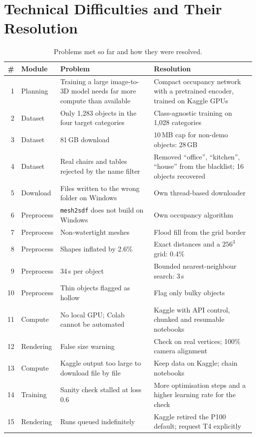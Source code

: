 \chapter{Technical Difficulties and Their Resolution}

\begin{table}[H]
\centering
\caption{Problems met so far and how they were resolved.}
\small
\begin{tabularx}{\textwidth}{rlXX}
\toprule
\# & Module & Problem & Resolution \\
\midrule
1 & Planning & Training a large image-to-3D model needs far more compute than available & Compact occupancy network with a pretrained encoder, trained on Kaggle GPUs \\
2 & Dataset & Only 1{,}283 objects in the four target categories & Class-agnostic training on 1{,}028 categories \\
3 & Dataset & 81\,GB download & 10\,MB cap for non-demo objects: 28\,GB \\
4 & Dataset & Real chairs and tables rejected by the name filter & Removed ``office'', ``kitchen'', ``house'' from the blacklist; 16 objects recovered \\
5 & Download & Files written to the wrong folder on Windows & Own thread-based downloader \\
6 & Preprocess & \texttt{mesh2sdf} does not build on Windows & Own occupancy algorithm \\
7 & Preprocess & Non-watertight meshes & Flood fill from the grid border \\
8 & Preprocess & Shapes inflated by 2.6\% & Exact distances and a $256^3$ grid: 0.4\% \\
9 & Preprocess & 34\,s per object & Bounded nearest-neighbour search: 3\,s \\
10 & Preprocess & Thin objects flagged as hollow & Flag only bulky objects \\
11 & Compute & No local GPU; Colab cannot be automated & Kaggle with API control, chunked and resumable notebooks \\
12 & Rendering & False size warning & Check on real vertices; 100\% camera alignment \\
13 & Compute & Kaggle output too large to download file by file & Keep data on Kaggle; chain notebooks \\
14 & Training & Sanity check stalled at loss 0.6 & More optimisation steps and a higher learning rate for the check \\
15 & Rendering & Runs queued indefinitely & Kaggle retired the P100 default; request T4 explicitly \\

\end{tabularx}
\end{table}

